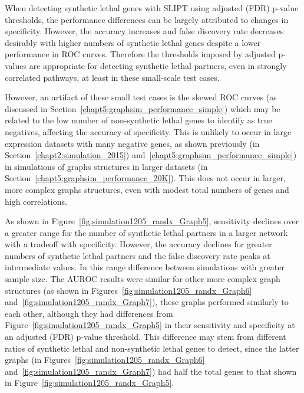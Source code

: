 When detecting synthetic lethal genes with \gls{SLIPT} using adjusted (FDR) p-value thresholds, the performance differences can be largely attributed to changes in specificity. However,  the accuracy increases and false discovery rate decreases desirably with higher numbers of synthetic lethal  genes despite a lower performance in \gls{ROC} curves. Therefore the thresholds imposed by adjusted p-values are appropriate for detecting synthetic lethal partners, even in strongly correlated pathways, at least in these small-scale test cases.

However, an artifact of these small test cases is the skewed \gls{ROC} curves (as discussed in Section~\ref{chapt5:graphsim_performance_simple}) which may be related to the low number of non-synthetic lethal genes to identify as true negatives, affecting the accuracy of specificity. This is unlikely to occur in large expression datasets with many negative genes, as shown previously (in Section~\ref{chapt2:simulation_2015}) and~\ref{chapt5:graphsim_performance_simple}) in simulations of graphs structures in larger datasets (in Section~\ref{chapt5:graphsim_performance_20K}). This does not occur in larger, more complex graphs structures, even with modest total numbers of genes and high correlations.

As shown in Figure~\ref{fig:simulation1205_randx_Graph5}, sensitivity declines over a greater range for the number of synthetic lethal partners in a larger network with a tradeoff with specificity. However,  the accuracy declines for greater numbers of synthetic lethal partners and the false discovery rate peaks at intermediate values. In this range difference between simulations with greater sample size. The \gls{AUROC} results were similar for other more complex graph structures (as shown in Figures~\ref{fig:simulation1205_randx_Graph6} and~\ref{fig:simulation1205_randx_Graph7}), these graphs performed similarly to each other, although they had differences from Figure~\ref{fig:simulation1205_randx_Graph5} in their sensitivity and specificity at an adjusted (FDR) p-value threshold. This difference may stem from different ratios of synthetic lethal and non-synthetic lethal genes to detect, since the latter graphs (in Figures~\ref{fig:simulation1205_randx_Graph6} and~\ref{fig:simulation1205_randx_Graph7}) had half the total genes to that shown in Figure~\ref{fig:simulation1205_randx_Graph5}.

